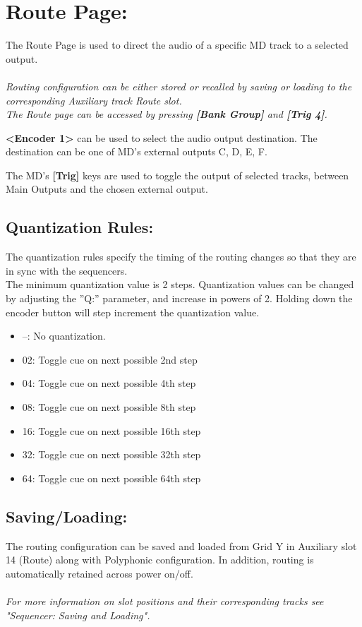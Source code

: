  \chapter{Route Page:}
 The Route Page is used to direct the audio of a specific MD track to a selected output.\\\\\textit{Routing configuration can be either stored or recalled by saving or loading to the corresponding Auxiliary track Route slot.} \\
 
\textit{The Route page can be accessed by pressing \textbf{[Bank Group]} and \textbf{[Trig 4]}.}


\textbf{<Encoder 1>} can be used to select the audio output destination. The destination can be one of MD's external outputs C, D, E, F.

The MD's \textbf{[Trig]} keys are used to toggle the output of selected tracks, between Main Outputs and the chosen external output.

\newpage
\section{Quantization Rules:}
The quantization rules specify the timing of the routing changes so that they are in sync with the sequencers.\\
The minimum quantization value is 2 steps. Quantization values can be changed by adjusting
the ”Q:” parameter, and increase in powers of 2. Holding down the encoder button will step
increment the quantization value.
 \begin{itemize}
\item --: No quantization.
\item 02: Toggle cue on next possible 2nd step
\item 04: Toggle cue on next possible 4th step
\item 08: Toggle cue on next possible 8th step 
\item 16: Toggle cue on next possible 16th step 
\item 32: Toggle cue on next possible 32th step 
\item 64: Toggle cue on next possible 64th step
 \end{itemize}
 
 \section{Saving/Loading:}
The routing configuration can be saved and loaded from Grid Y in Auxiliary slot 14 (Route) along with Polyphonic configuration. In addition, routing is automatically retained across power on/off.\\\\
\textit{For more information on slot positions and their corresponding tracks see  "Sequencer: Saving and Loading".}

 
 